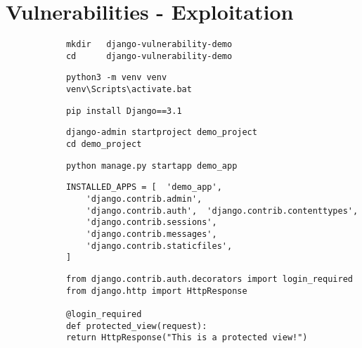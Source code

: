 	\newpage
	\section{Vulnerabilities - Exploitation}
	
	
		\begin{verbatim}
			mkdir 	django-vulnerability-demo
			cd 		django-vulnerability-demo
		\end{verbatim}
	
	
		\begin{verbatim}
			python3 -m venv venv
			venv\Scripts\activate.bat
		\end{verbatim}

	
		\begin{verbatim}
			pip install Django==3.1
		\end{verbatim}

		\begin{verbatim}
			django-admin startproject demo_project
			cd demo_project
		\end{verbatim}

		\begin{verbatim}
			python manage.py startapp demo_app
		\end{verbatim}

		\begin{verbatim}
			INSTALLED_APPS = [	'demo_app',
				'django.contrib.admin',
				'django.contrib.auth',	'django.contrib.contenttypes',	
				'django.contrib.sessions',	
				'django.contrib.messages',
				'django.contrib.staticfiles',
			]		
		\end{verbatim}

		\begin{verbatim}
			from django.contrib.auth.decorators import login_required
			from django.http import HttpResponse
			
			@login_required
			def protected_view(request):
			return HttpResponse("This is a protected view!")
		\end{verbatim}

